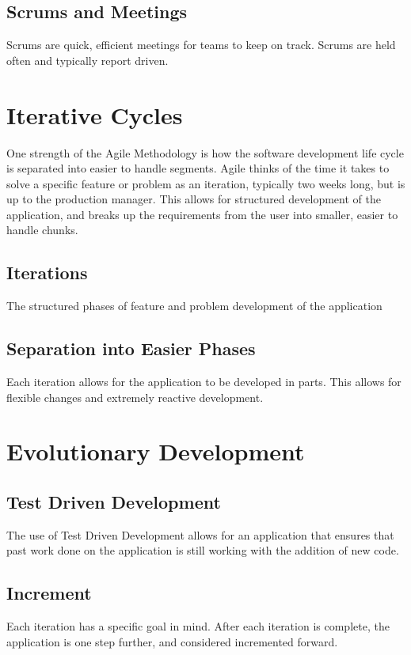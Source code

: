\documentclass[11pt]{article}
\begin{document}
\subsection{Scrums and Meetings}
Scrums are quick, efficient meetings for
teams to keep on track. Scrums are held often and typically report driven.

\section{Iterative Cycles}

One strength of the Agile Methodology is how the software development life cycle is separated into easier to handle segments.
Agile thinks of the time it takes to solve a specific feature or problem as an iteration, typically two weeks long, but
is up to the production manager. This allows for structured development of the application, and breaks
up the requirements from the user into smaller, easier to handle chunks. 

\subsection{Iterations} 
The structured phases of feature and problem development of the application

\subsection{Separation into Easier Phases} 
Each iteration allows for the application to be developed in parts. This allows for flexible changes and
extremely reactive development.~\cite{Cao:2010:MDA:1877725.1877730}

\section{Evolutionary Development}

\subsection{Test Driven Development}
The use of Test Driven Development allows for an application that ensures that past work done on the application
is still working with the addition of new code.

\subsection{Increment} 
Each iteration has a specific goal in mind. After each iteration is complete, the application is one
step further, and considered incremented forward.
\end{document}
